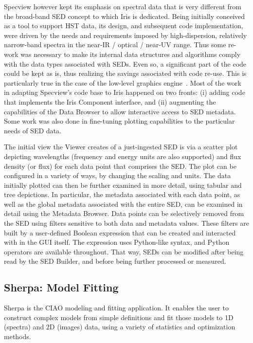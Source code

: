 \documentclass[final,5p,authoryear]{elsarticle}
\begin{document}
Specview however kept its emphasis on spectral data that is very different from
the broad-band SED concept to which Iris is dedicated. Being initially conceived
as a tool to support HST data, its design, and subsequent code implementation,
were driven by the needs and requirements imposed by high-dispersion, relatively
narrow-band spectra in the near-IR / optical / near-UV range. Thus some re-work
was necessary to make its internal data structures and algorithms comply with
the data types associated with SEDs. Even so, a significant part of the code
could be kept as is, thus realizing the savings associated with code re-use.
This is particularly true in the case of the low-level graphics
engine~\citep{2000ASPC..216...79B}. Most of the work in adapting Specview's code
base to Iris happened on two fronts: (i) adding code that implements the Iris
Component interface, and (ii) augmenting the capabilities of the Data Browser to
allow interactive access to SED metadata. Some work was also done in fine-tuning
plotting capabilities to the particular needs of SED data.

The initial view the Viewer creates of a just-ingested SED is via a scatter plot
depicting wavelengths (frequency and energy units are also supported) and flux
density (or flux) for each data point that comprises the SED. The plot can be
configured in a variety of ways, by changing the scaling and units. The data
initially plotted can then be further examined in more detail, using tabular and
tree depictions. In particular, the metadata associated with each data point, as
well as the global metadata associated with the entire SED, can be examined in
detail using the Metadata Browser. Data points can be selectively removed from
the SED using filters sensitive to both data and metadata values. These filters
are built by a user-defined Boolean expression that can be created and
interacted with in the GUI itself. The expression uses Python-like syntax, and
Python operators are available throughout. That way, SEDs can be modified after
being read by the SED Builder, and before being further processed or measured.

\subsection{Sherpa: Model Fitting} \label{subsec:sherpa} Sherpa is the CIAO
modeling and fitting application. It enables the user to construct complex
models from simple definitions and fit those models to 1D (spectra) and 2D
(images) data, using a variety of statistics and optimization methods.
\end{document}
